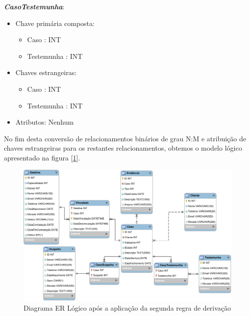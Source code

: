 \documentclass[a4paper,12pt]{scrreprt}
\begin{document}
        \clearpage           
        
        \textbf{\textit{CasoTestemunha}}:
        \begin{itemize}
            \item Chave primária composta:
                \begin{itemize}
                    \item Caso : INT
                    \item Testemunha : INT
                \end{itemize}
            \item Chaves estrangeiras:
                \begin{itemize}
                    \item Caso : INT
                    \item Testemunha : INT
                \end{itemize}
            \item Atributos: Nenhum
        \end{itemize}

        \vspace{0.2cm}

        No fim desta conversão de relacionamentos binários de grau N:M e atribuição de chaves estrangeiras para os restantes relacionamentos, obtemos o modelo lógico apresentado na figura [\ref{fig:4.2}].


        \begin{figure}
            \centering
            \includegraphics[scale=1,angle=0]{images/modelo_logico/regra2.pdf}
            \caption{Diagrama ER Lógico após a aplicação da segunda regra de derivação}
            \label{fig:4.2}
        \end{figure}
\end{document}
